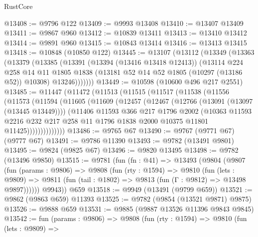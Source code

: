 \begin{lexlean}{RustCore}
\begin{coremodule}
@13408 := @9796 @122
@13409 := @9993 @13408
@13410 := @13407 @13409
@13411 := @9867 @960
@13412 := @10839 @13411
@13413 := @13410 @13412
@13414 := @9891 @960
@13415 := @10843 @13414
@13416 := @13413 @13415
@13418 := @10848 (@10850 @122)
@13445 := @13107
    (@13112
      (@13349
        (@13363
          (@13379
            (@13385
              (@13391
                (@13394 (@13416 @13418 @12413))
                (@13114
                  @224
                  @258
                  @14
                  @11
                  @1805
                  @1838
                  (@13181 @52 @14 @52 @1805 (@10297 (@13186 @52)) @10308)
                  @13246)))))))
@13449 := @10598 (@10600 @496 @217 @2551)
@13485 := @11447
    (@11472
      (@11513
        (@11515
          (@11517
            (@11538
              (@11556
                (@11573
                  (@11594
                    (@11605
                      (@11609
                        (@12457
                          (@12467
                            (@12766 (@13091 (@13097 (@13445 @13449))))
                            (@11406
                              @11593
                              @366
                              @217
                              @1796
                              @2002
                              (@10363
                                @11593
                                @2216
                                @232
                                @217
                                @258
                                @11
                                @1796
                                @1838
                                @2000
                                @10375
                                @11801
                                @11425))))))))))))))
@13486 := @9765 @67
@13490 := @9767 (@9771 @67) (@9777 @67)
@13491 := @9786 @11390
@13493 := @9782 (@13491 @9801)
@13495 := @9824 (@9825 @67)
@13496 := @9820 @13495
@13498 := @9782 (@13496 @9850)
@13515 := @9781
    (fun (fn : @41) =>
    @13493
      (@9804
        (@9807
          (fun (params : @9806) =>
          @9808
            (fun (rty : @1594) =>
            @9810
              (fun (lets : @9809) =>
              @9811 (fun (tail : @1802) => @9813 (fun (Γ : @9812) => @13498 @9897))))))
        @9943))
    @659
@13518 := @9949 (@13491 (@9799 @659))
@13521 := @9862 (@9863 @659) @11393
@13525 := @9782 (@9854 (@13521 @9871) @9875)
@13526 := @9888 @659
@13531 := @9885 (@9887 @13526 @11396 @9843 @9845)
@13542 := fun (params : @9806) =>
  @9808
    (fun (rty : @1594) =>
    @9810
      (fun (lets : @9809) =>

\end{coremodule}
\end{lexlean}
